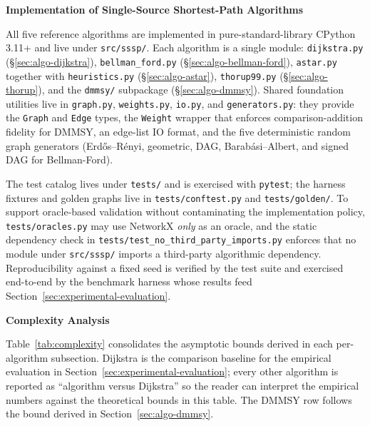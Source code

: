 \documentclass[12pt]{article}
\begin{document}
\newpage
\noindent\textbf{Implementation of Single-Source Shortest-Path Algorithms}\label{sec:implementation}
\medskip

All five reference algorithms are implemented in pure-standard-library CPython 3.11+ and live under \texttt{src/sssp/}. Each algorithm is a single module: \texttt{dijkstra.py} (\S\ref{sec:algo-dijkstra}), \texttt{bellman\_ford.py} (\S\ref{sec:algo-bellman-ford}), \texttt{astar.py} together with \texttt{heuristics.py} (\S\ref{sec:algo-astar}), \texttt{thorup99.py} (\S\ref{sec:algo-thorup}), and the \texttt{dmmsy/} subpackage (\S\ref{sec:algo-dmmsy}). Shared foundation utilities live in \texttt{graph.py}, \texttt{weights.py}, \texttt{io.py}, and \texttt{generators.py}: they provide the \texttt{Graph} and \texttt{Edge} types, the \texttt{Weight} wrapper that enforces comparison-addition fidelity for DMMSY, an edge-list IO format, and the five deterministic random graph generators (Erdős--Rényi, geometric, DAG, Barabási--Albert, and signed DAG for Bellman-Ford).

The test catalog lives under \texttt{tests/} and is exercised with \texttt{pytest}; the harness fixtures and golden graphs live in \texttt{tests/conftest.py} and \texttt{tests/golden/}. To support oracle-based validation without contaminating the implementation policy, \texttt{tests/oracles.py} may use NetworkX \emph{only} as an oracle, and the static dependency check in \texttt{tests/test\_no\_third\_party\_imports.py} enforces that no module under \texttt{src/sssp/} imports a third-party algorithmic dependency. Reproducibility against a fixed seed is verified by the test suite and exercised end-to-end by the benchmark harness whose results feed Section~\ref{sec:experimental-evaluation}.

\newpage
\noindent\textbf{Complexity Analysis}\label{sec:complexity}
\medskip

Table~\ref{tab:complexity} consolidates the asymptotic bounds derived in each per-algorithm subsection. Dijkstra is the comparison baseline for the empirical evaluation in Section~\ref{sec:experimental-evaluation}; every other algorithm is reported as ``algorithm versus Dijkstra'' so the reader can interpret the empirical numbers against the theoretical bounds in this table. The DMMSY row follows the bound derived in Section~\ref{sec:algo-dmmsy}.
\end{document}

